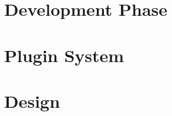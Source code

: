 \begin{minipage}[t][\textheight][t]{\linewidth}
	\section*{
	  Development Phase
	 }
	\vspace{-0.25cm}%
	
	\vfill
	\section*{
	  Plugin System
	 }
	\vspace{-0.25cm}%
	\begin{center}
		\begin{minipage}[t]{0.8\linewidth}
			
		\end{minipage}
	\end{center}
	\vspace{-\baselineskip}
	\vfill
	\vspace{-\baselineskip}
	\section*{
	  Design
	 }
	\vspace{-0.25cm}%
	\setlength{\MinipageGap}{0.5cm}
	\setlength{\MinipageAWidth}{\dimexpr ((0.5875\linewidth) - (\MinipageGap))\relax}%
	\setlength{\MinipageBWidth}{\dimexpr (\linewidth - \MinipageAWidth - \MinipageGap)\relax}
	\begin{minipage}[t]{\MinipageAWidth}%
		
	\end{minipage}%
	\hspace{\MinipageGap}%
	\begin{minipage}[t]{\MinipageBWidth}%
		
	\end{minipage}%
	\vfill
\end{minipage}
\newpage
\setlength{\columnsep}{0.25cm}%
\begin{multicols}{2}
	
	
\end{multicols}

